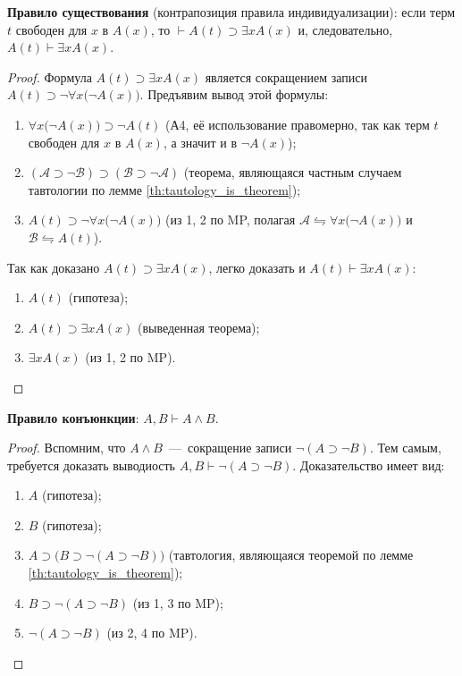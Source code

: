 \textbf{Правило существования} (контрапозиция правила индивидуализации): если терм $t$ свободен для $x$ в $A(x)$, то $\vdash A(t) \supset \exists xA(x)$ и, следовательно, $A(t) \vdash \exists xA(x)$.
\begin{proof}
    Формула $A(t) \supset \exists xA(x)$ является сокращением записи $A(t) \supset \neg \forall x\big(\neg A(x)\big)$. Предъявим вывод этой формулы:
    \begin{enumerate}
        \item $\forall x\big(\neg A(x)\big) \supset \neg A(t)$ (А4, её использование правомерно, так как терм $t$ свободен для $x$ в $A(x)$, а значит и в $\neg A(x)$);
        \item $(\mathcal{A} \supset \neg \mathcal{B}) \supset (\mathcal{B} \supset \neg \mathcal{A})$ (теорема, являющаяся частным случаем тавтологии по лемме \ref{th:tautology_is_theorem});
        \item $A(t) \supset \neg\forall x\big(\neg A(x)\big)$ (из 1, 2 по MP, полагая $\mathcal{A} \leftrightharpoons \forall x\big(\neg A(x)\big)$ и $\mathcal{B} \leftrightharpoons A(t)$).
    \end{enumerate}
    Так как доказано $A(t) \supset \exists xA(x)$, легко доказать и $A(t) \vdash \exists xA(x)$:
    \begin{enumerate}
        \item $A(t)$ (гипотеза);
        \item $A(t) \supset \exists xA(x)$ (выведенная теорема);
        \item $\exists xA(x)$ (из 1, 2 по MP).
    \end{enumerate}
\end{proof}

\textbf{Правило конъюнкции}: $A, B \vdash A \land B$.
\begin{proof}Вспомним, что $A \land B$~---~сокращение записи $\neg(A \supset \neg B)$. Тем самым, требуется доказать выводиость $A, B \vdash \neg(A \supset \neg B)$. Доказательство имеет вид:
    \begin{enumerate}
        \item $A$ (гипотеза);
        \item $B$ (гипотеза);
        \item $A \supset \big(B \supset \neg(A \supset \neg B)\big)$ (тавтология, являющаяся теоремой по лемме \ref{th:tautology_is_theorem});
        \item $B \supset \neg(A \supset \neg B)$ (из 1, 3 по MP);
        \item $\neg(A \supset \neg B)$ (из 2, 4 по MP).
    \end{enumerate}
\end{proof}

